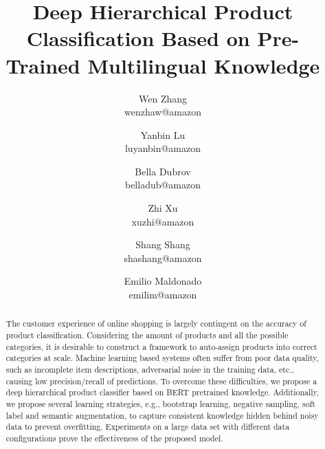 \documentclass[11pt,dvipsnames]{article}
\begin{document}
\title{Deep Hierarchical Product Classification Based on Pre-Trained Multilingual Knowledge}
\author{Wen Zhang \\ wenzhaw@amazon \and
Yanbin Lu \\ luyanbin@amazon \and 
Bella Dubrov \\ belladub@amazon \and
Zhi Xu \\ xuzhi@amazon \and
Shang Shang \\ shashang@amazon \and
Emilio Maldonado \\ emilim@amazon}




\maketitle

\newcommand{\ziawasch}[1]{\textcolor{blue}{Ziawasch: #1}}
\newcommand{\Felix}[1]{\textcolor{purple}{Felix: #1}}
\newcommand{\Binger}[1]{\textcolor{red}{Binger: #1}}
\newcommand{\Eugene}[1]{\textcolor{blue}{Eugene: #1}}
\newcommand{\ewu}[1]{\textcolor{red}{ewu: #1}}
\newcommand{\todo}[1]{\textcolor{red}{TODO #1}}
\newcommand{\stitle}[1]{\vspace{0.8ex}\noindent{\bf #1}}
\newcommand{\system}{\textsc{CycleClean}}


\newcommand{\smallestfont}{\scriptsize}





\begin{abstract}
The customer experience of online shopping is largely contingent on the accuracy of product classification. Considering the amount of products and all the possible categories, it is desirable to construct a framework to auto-assign products into correct categories at scale. Machine learning based systems often suffer from poor data quality, such as incomplete item descriptions, adversarial noise in the training data, etc., causing low precision/recall of predictions. To overcome these difficulties, we propose a deep hierarchical product classifier based on BERT pretrained knowledge. Additionally, we propose several learning strategies, e.g., bootstrap learning, negative sampling, soft label and semantic augmentation, to capture consistent knowledge hidden behind noisy data to prevent overfitting. Experiments on a large data set with different data configurations prove the effectiveness of the proposed model.

\end{abstract}
\end{document}
